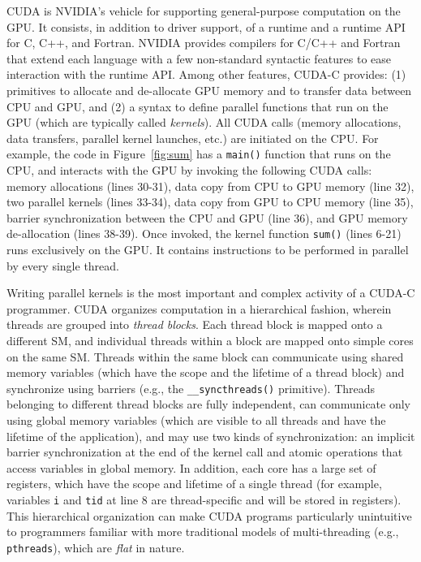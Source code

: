 CUDA is NVIDIA's vehicle for supporting general-purpose computation on the GPU.
It consists, in addition to driver support, of a runtime and a runtime API for
C, C++, and Fortran. NVIDIA provides compilers for C/C++ and Fortran that extend
each language with a few non-standard syntactic features to ease interaction
with the runtime API. Among other features, CUDA-C provides: (1) primitives to
allocate and de-allocate GPU memory and to transfer data between CPU and GPU,
and (2) a syntax to define parallel functions that run on the GPU (which are
typically called {\em kernels}). All CUDA calls (memory allocations, data
transfers, parallel kernel launches, etc.) are initiated on the CPU. For
example, the code in Figure~\ref{fig:sum} has a {\tt main()} function that runs
on the CPU, and interacts with the GPU by invoking the following CUDA calls:
memory allocations (lines 30-31), data copy from CPU to GPU memory (line 32),
two parallel kernels (lines 33-34), data copy from GPU to CPU memory (line 35),
barrier synchronization between the CPU and GPU (line 36), and GPU memory
de-allocation (lines 38-39). Once invoked, the kernel function {\tt sum()}
(lines 6-21) runs exclusively on the GPU. It contains instructions to be
performed in parallel by every single thread.

Writing parallel kernels is the most important and complex activity of a CUDA-C
programmer. CUDA organizes computation in a hierarchical fashion, wherein
threads are grouped into {\em thread blocks}. Each thread block is mapped onto a
different SM, and individual threads within a block are mapped onto simple cores
on the same SM. Threads within the same block can communicate using shared
memory variables (which have the scope and the lifetime of a thread block) and
synchronize using barriers (e.g., the {\tt \_\_syncthreads()} primitive).
Threads belonging to different thread blocks are fully independent, can
communicate only using global memory variables (which are visible to all threads
and have the lifetime of the application), and may use two kinds of
synchronization: an implicit barrier synchronization at the end of the kernel
call and atomic operations that access variables in global memory. In addition,
each core has a large set of registers, which have the scope and lifetime of a
single thread (for example, variables {\tt i} and {\tt tid} at line 8 are
thread-specific and will be stored in registers). This hierarchical organization
can make CUDA programs particularly unintuitive to programmers familiar with
more traditional models of multi-threading (e.g., {\tt pthreads}), which are
\emph{flat} in nature. 

